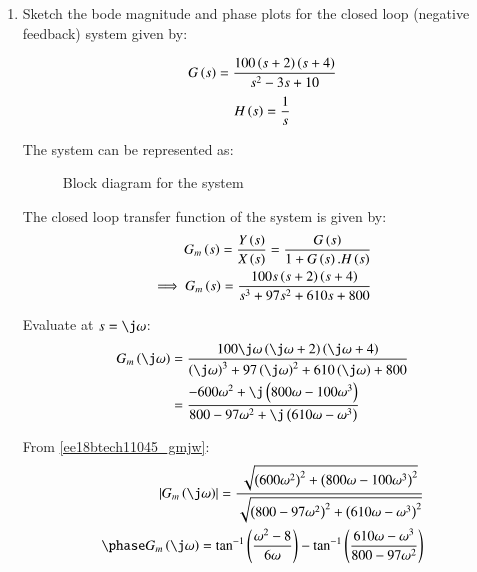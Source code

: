 \begin{enumerate}[label=\thesubsection.\arabic*.,ref=\thesubsection.\theenumi]

\item Sketch the bode magnitude and phase plots for the closed loop (negative feedback) system given by:

\begin{align}
    G\left(s\right) = \frac{100\left(s+2\right)\left(s+4\right)}{s^2 - 3s + 10}
    \label{ee18btech11045_gs}
\end{align}
\begin{align}
    H\left(s\right) = \frac{1}{s}
\end{align}

\solution
The system can be represented as:
\begin{figure}[!ht]
	\begin{center}
		\resizebox{\columnwidth}{!}{}
	\end{center}
\caption{Block diagram for the system}
\label{fig:ee18btech11045_1}
\end{figure}

The closed loop transfer function of the system is given by:
\begin{align}
    G_m\left(s\right) = \frac{Y\left(s\right)}{X\left(s\right)} = \frac{G\left(s\right)}{1 + G\left(s\right).H\left(s\right)}
    \\
    \implies G_m\left(s\right) = \frac{100s\left(s+2\right)\left(s+4\right)}{s^3 + 97s^2 + 610s + 800}
    \label{ee18btech11045_gm}
\end{align}

Evaluate at $s = \j\omega$:
\begin{align}
    G_m\brak{\j\omega} &= \frac{100\j\omega\brak{\j\omega+2}\brak{\j\omega+4}}{\brak{\j\omega}^3 + 97\brak{\j\omega}^2 + 610\brak{\j\omega} + 800}
    \\
    &= \frac{-600\omega^2 + \j\brak{800\omega - 100\omega^3}}{800 - 97\omega^2 + \j\brak{610\omega - \omega^3}}
    \label{ee18btech11045_gmjw}
\end{align}

From \eqref{ee18btech11045_gmjw}:
\begin{align}
    \abs{G_m\brak{\j\omega}} = \frac{\sqrt{\brak{600\omega^2}^2 + \brak{800\omega-100\omega^3}^2}}{\sqrt{\brak{800 - 97\omega^2}^2+\brak{610\omega-\omega^3}^2}}
    \\
    \phase G_m\brak{\j\omega} = \tan^{-1}\brak{\frac{\omega^2 - 8}{6\omega}}
    -\tan^{-1}\brak{\frac{610\omega-\omega^3}{800-97\omega^2}}
\end{align}
    

\end{enumerate}

